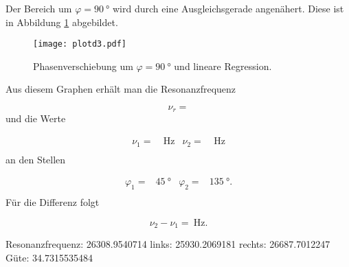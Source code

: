 Der Bereich um $\varphi = \SI{90}{\degree}$ wird durch eine Ausgleichsgerade
angenähert. Diese ist in Abbildung \ref{fig:Phaseklein} abgebildet.

\begin{figure}
  \centering
  \texttt{[image: plotd3.pdf]}
  \caption{Phasenverschiebung um $\varphi = \SI{90}{\degree}$ und lineare
  Regression.}
  \label{fig:Phaseklein}
\end{figure}

Aus diesem Graphen erhält man die Resonanzfrequenz

\begin{equation}
  \nu_r =
\end{equation}
und die Werte

\begin{align}
  \nu_1 = & \SI{}{\hertz} & \nu_2 = & \SI{}{\hertz} \\
\end{align}
an den Stellen

\begin{align}
  \varphi_1 = & \SI{45}{\degree} & \varphi_2 = & \SI{135}{\degree}. \\
\end{align}
Für die Differenz folgt

\begin{equation}
  \nu_2 - \nu_1 = \SI{}{\hertz}.
\end{equation}


Resonanzfrequenz: 26308.9540714
links: 25930.2069181
rechts: 26687.7012247
Güte: 34.7315535484
